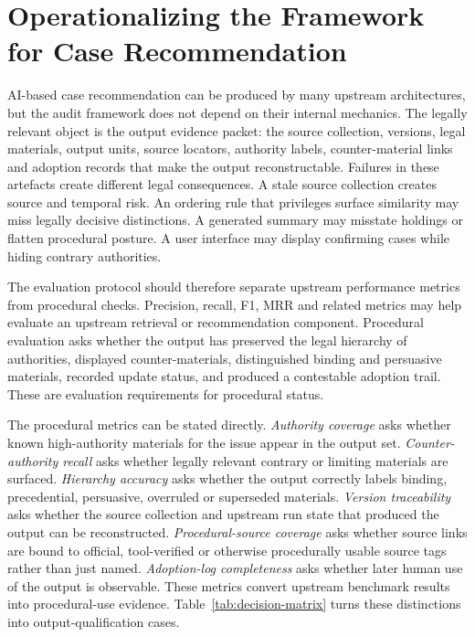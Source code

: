 \documentclass[12pt,a4paper]{article}
\begin{document}
\section{Operationalizing the Framework for Case Recommendation}

AI-based case recommendation can be produced by many upstream architectures, but the audit framework does not depend on their internal mechanics. The legally relevant object is the output evidence packet: the source collection, versions, legal materials, output units, source locators, authority labels, counter-material links and adoption records that make the output reconstructable. Failures in these artefacts create different legal consequences. A stale source collection creates source and temporal risk. An ordering rule that privileges surface similarity may miss legally decisive distinctions. A generated summary may misstate holdings or flatten procedural posture. A user interface may display confirming cases while hiding contrary authorities.

The evaluation protocol should therefore separate upstream performance metrics from procedural checks. Precision, recall, F1, MRR and related metrics may help evaluate an upstream retrieval or recommendation component. Procedural evaluation asks whether the output has preserved the legal hierarchy of authorities, displayed counter-materials, distinguished binding and persuasive materials, recorded update status, and produced a contestable adoption trail. These are evaluation requirements for procedural status.

The procedural metrics can be stated directly. \textit{Authority coverage} asks whether known high-authority materials for the issue appear in the output set. \textit{Counter-authority recall} asks whether legally relevant contrary or limiting materials are surfaced. \textit{Hierarchy accuracy} asks whether the output correctly labels binding, precedential, persuasive, overruled or superseded materials. \textit{Version traceability} asks whether the source collection and upstream run state that produced the output can be reconstructed. \textit{Procedural-source coverage} asks whether source links are bound to official, tool-verified or otherwise procedurally usable source tags rather than just named. \textit{Adoption-log completeness} asks whether later human use of the output is observable. These metrics convert upstream benchmark results into procedural-use evidence. Table~\ref{tab:decision-matrix} turns these distinctions into output-qualification cases.
\end{document}
